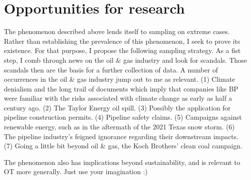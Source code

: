
\section*{Opportunities for research}

The phenomenon described above lends itself to sampling on extreme cases. Rather than establishing the prevalence of this phenomenon, I seek to prove its existence. For that purpose, I propose the following sampling strategy. As a fist step, I comb through news on the oil \& gas industry and look for scandals. Those scandals then are the basis for a further collection of data. A number of occurrences in the oil \& gas industry jump out to me as relevant. (1) Climate denialism and the long trail of documents which imply that companies like BP were familiar with the risks associated with climate change as early as half a century ago. (2) The Taylor Energy oil spill. (3) Possibly the application for pipeline construction permits. (4) Pipeline safety claims. (5)  Campaigns against renewable energy, such as in the aftermath of the 2021 Texas snow storm. (6) The pipeline industry's feigned ignorance regarding their downstream impacts. (7) Going a little bit beyond oil \& gas, the Koch Brothers' clean coal campaign.

The phenomenon also has implications beyond sustainability, and is relevant to OT more generally. Just use your imagination :)